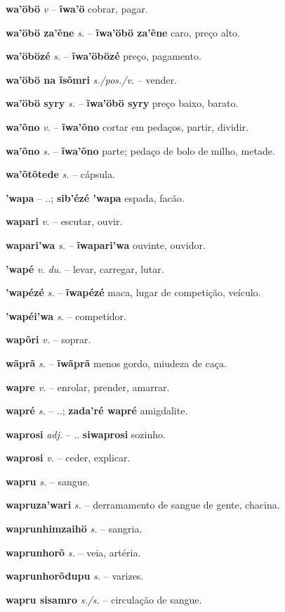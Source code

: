 \textbf{wa'öbö} \textit{v} -- \textbf{ĩwa'ö} cobrar, pagar.

\textbf{wa'öbö za'ẽne} \textit{s.} -- \textbf{ĩwa'öbö za'ẽne} caro, preço alto.

\textbf{wa'öbözé} \textit{s.} -- \textbf{ĩwa'öbözé} preço, pagamento.

\textbf{wa'öbö na ĩsõmri} \textit{s./pos./v.} -- vender.

\textbf{wa'öbö syry} \textit{s.} -- \textbf{ĩwa'öbö syry} preço baixo, barato.

\textbf{wa'õno} \textit{v.} -- \textbf{ĩwa'õno} cortar em pedaços, partir, dividir.

\textbf{wa'õno} \textit{s.} -- \textbf{ĩwa'õno} parte; pedaço de bolo de milho, metade.

\textbf{wa'õtõtede} \textit{s.} -- cápsula.

\textbf{'wapa} \textit{} -- ..; \textbf{sib'ézé 'wapa} espada, facão.

\textbf{wapari} \textit{v.} -- escutar, ouvir.

\textbf{wapari'wa} \textit{s.} -- \textbf{ĩwapari'wa} ouvinte, ouvidor.

\textbf{'wapé} \textit{v. du.} -- levar, carregar, lutar.

\textbf{'wapézé} \textit{s.} -- \textbf{ĩwapézé} maca, lugar de competição, veículo.

\textbf{'wapéi'wa} \textit{s.} -- competidor.

\textbf{wapõri} \textit{v.} -- soprar.

\textbf{wãprã} \textit{s.} -- \textbf{ĩwãprã} menos gordo, miudeza de caça.

\textbf{wapre} \textit{v.} -- enrolar, prender, amarrar.

\textbf{wapré} \textit{s.} -- ..; \textbf{zada'ré wapré} amigdalite.

\textbf{waprosi} \textit{adj.} -- .. \textbf{siwaprosi} sozinho.

\textbf{waprosi} \textit{v.} -- ceder, explicar.

\textbf{wapru} \textit{s.} -- sangue.

\textbf{wapruza'wari} \textit{s.} -- derramamento de sangue de gente, chacina.

\textbf{waprunhimzaihö} \textit{s.} -- sangria.

\textbf{waprunhorõ} \textit{s.} -- veia, artéria.

\textbf{waprunhorõdupu} \textit{s.} -- varizes.

\textbf{wapru sisamro} \textit{s./s.} -- circulação de sangue.

